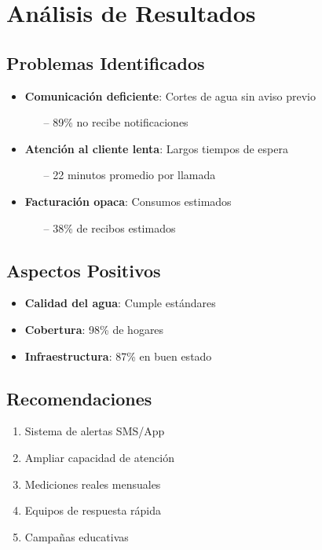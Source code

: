 \documentclass{article}
\begin{document}
\section*{Análisis de Resultados}

\subsection*{Problemas Identificados}
\begin{itemize}
  \item \textbf{Comunicación deficiente}: Cortes de agua sin aviso previo
  \begin{itemize}
      \item[--] 89\% no recibe notificaciones
  \end{itemize}
  
  \item \textbf{Atención al cliente lenta}: Largos tiempos de espera
  \begin{itemize}
      \item[--] 22 minutos promedio por llamada
  \end{itemize}
  
  \item \textbf{Facturación opaca}: Consumos estimados
  \begin{itemize}
      \item[--] 38\% de recibos estimados
  \end{itemize}
\end{itemize}

\subsection*{Aspectos Positivos}
\begin{itemize}
  \item \textbf{Calidad del agua}: Cumple estándares
  \item \textbf{Cobertura}: 98\% de hogares
  \item \textbf{Infraestructura}: 87\% en buen estado
\end{itemize}

\subsection*{Recomendaciones}
\begin{enumerate}
  \item Sistema de alertas SMS/App
  \item Ampliar capacidad de atención
  \item Mediciones reales mensuales
  \item Equipos de respuesta rápida
  \item Campañas educativas
\end{enumerate}
\end{document}
